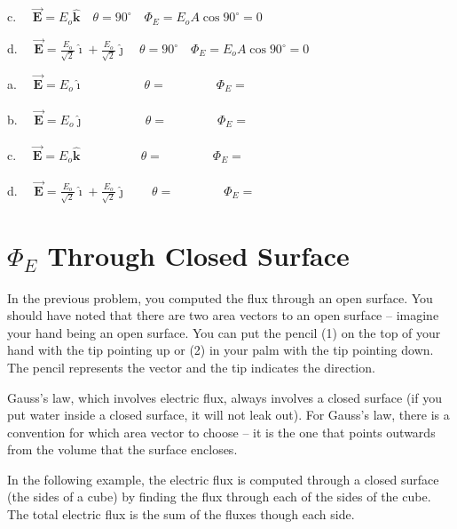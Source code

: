 \documentclass{article}
\newcommand{\ds}[0]{\displaystyle}
\newcommand{\ihat}[0]{\hat{\boldsymbol{\imath}}}
\newcommand{\jhat}[0]{\hat{\boldsymbol{\jmath}}}
\newcommand{\khat}[0]{\hat{\boldsymbol{k}}}
\newcommand{\bfvec}[1]{\vec{\mathbf{#1}}}
\begin{document}
c. $\quad\ds\bfvec{E}=E_o\khat\quad\theta=90^\circ\quad\Phi_E=E_oA\cos 90^\circ=0$ 

d. $\quad\ds\bfvec{E}=\frac{E_o}{\sqrt{2}}\ihat + \frac{E_o}{\sqrt{2}}\jhat\quad\theta=90^\circ\quad\Phi_E=E_oA\cos 90^\circ=0$
\else



a. $\quad\ds\bfvec{E}=E_o\ihat\qquad\phantom{+\frac{E_o}{\sqrt{2}}\jhat}\theta=\qquad\qquad\Phi_E=$

b. $\quad\ds\bfvec{E}=E_o\jhat\qquad\phantom{+ \frac{E_o}{\sqrt{2}}\jhat}\theta=\qquad\qquad\Phi_E=$ 

c. $\quad\ds\bfvec{E}=E_o\khat\qquad\phantom{+\frac{E_o}{\sqrt{2}}\jhat}\theta=\qquad\qquad\Phi_E=$ 

d. $\quad\ds\bfvec{E}=\frac{E_o}{\sqrt{2}}\ihat + \frac{E_o}{\sqrt{2}}\jhat\qquad\theta=\qquad\qquad\Phi_E=$
\fi

\section{$\Phi_E$ Through Closed Surface}

In the previous problem, you computed the flux through an open surface. You should have noted that there are two area vectors to an open surface -- imagine your hand being an open surface. You can put the pencil (1) on the top of your hand with the tip pointing up or (2) in your palm with the tip pointing down. The pencil represents the vector and the tip indicates the direction.

Gauss's law, which involves electric flux, always involves a closed surface (if you put water inside a closed surface, it will not leak out). For Gauss's law, there is a convention for which area vector to choose -- it is the one that points outwards from the volume that the surface encloses. 

In the following example, the electric flux is computed through a closed surface (the sides of a cube) by finding the flux through each of the sides of the cube. The total electric flux is the sum of the fluxes though each side.

\end{document}
